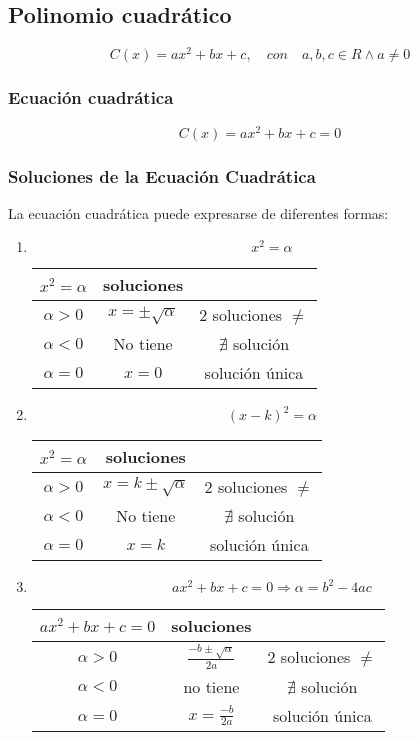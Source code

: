   \subsection{Polinomio cuadrático}
  \[ C(x)=ax^2+bx+c, \quad con \quad a,b,c \in R \wedge a \neq 0 \]
  \subsubsection{Ecuación cuadrática}
  \[ C(x)=ax^2+bx+c= 0\]
  \subsubsection{Soluciones de la Ecuación Cuadrática}
  La ecuación cuadrática puede expresarse de diferentes formas:
  \begin{enumerate}
  \item \[x^2=\alpha \]
    \begin{tabular}{|c|c|c|}
    $x^2=\alpha $ & soluciones  \\ \hline
    $ \alpha > 0$ & $x=\pm \sqrt{\alpha}$ & $2$ soluciones $\neq$ \\
    $ \alpha < 0$ & No tiene & $\nexists$ solución \\
    $ \alpha=0  $ & $x=0$ & solución única \\
    \end{tabular}
    \item \[(x -k)^2=\alpha \]
    \begin{tabular}{|c|c|c|}
    $x^2=\alpha$ & soluciones \\ \hline
    $ \alpha > 0$ & $x=k \pm \sqrt{\alpha}$ & $2$ soluciones $\neq$ \\
    $ \alpha < 0$ & No tiene& $\nexists$ solución \\
    $ \alpha=0$ & $x=k$ & solución única \\
    \end{tabular}
  \item \[ax^2+bx+c=0 \Rightarrow \alpha=b^2-4ac \]
  \begin{tabular}{|c|c|c|}
  $ax^2+bx+c=0$ &soluciones & \\ \hline
  $ \alpha > 0 $ & $\frac{-b \pm \sqrt{\alpha}}{2a}$ & $2$ soluciones $\neq$ \\
  $ \alpha < 0 $ &no tiene& $\nexists$ solución \\
  $ \alpha =0 $ & $x= \frac{-b }{2a}$ & solución única
  
  \end{tabular} 
  
  \end{enumerate}




    